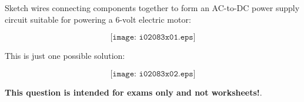

Sketch wires connecting components together to form an AC-to-DC power supply circuit suitable for powering a 6-volt electric motor:

$$\texttt{[image: i02083x01.eps]}$$







This is just one possible solution:

$$\texttt{[image: i02083x02.eps]}$$
 






{\bf This question is intended for exams only and not worksheets!}.




